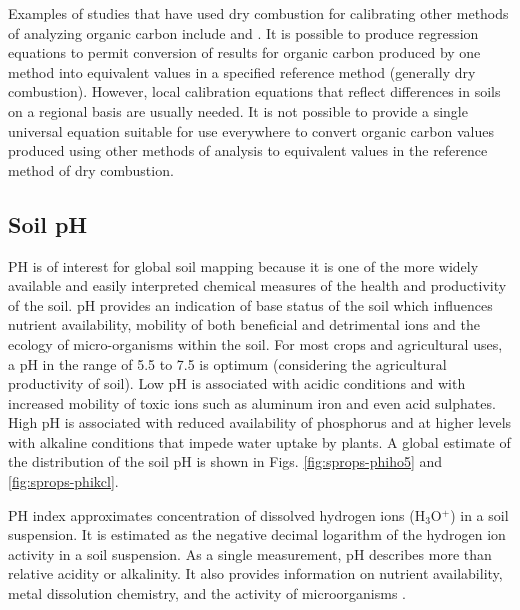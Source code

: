 \documentclass[11pt]{krantz}
\theoremstyle{definition}
\theoremstyle{definition}
\theoremstyle{definition}
\theoremstyle{remark}
\begin{document}
Examples of studies that have used dry combustion for calibrating other
methods of analyzing organic carbon include
\citeauthor{Kalembasa1973JSFA}
\citetext{\citeyear{Kalembasa1973JSFA}; \citealp{Grewal1991JSS}; \citealp{Soon1991CSSPA}; \citealp{Wang1996AJSR}; \citealp{Konen2002SSSAJ}; \citealp{Brye2003CSSPA}; \citealp{Mikhailova2003CSSPA}; \citealp{Bisutti2004TAC}; \citealp{Jankauskas2006CSSPA}; \citealp{DeVos2007SUM}}
and \citet{Meersmans2009SUM}. It is possible to produce regression
equations to permit conversion of results for organic carbon produced by
one method into equivalent values in a specified reference method
(generally dry combustion). However, local calibration equations that
reflect differences in soils on a regional basis are usually needed. It
is not possible to provide a single universal equation suitable for use
everywhere to convert organic carbon values produced using other methods
of analysis to equivalent values in the reference method of dry
combustion.

\hypertarget{soil-ph}{%
\subsection{Soil pH}\label{soil-ph}}

PH is of interest for global soil mapping because it is one of the more
widely available and easily interpreted chemical measures of the health
and productivity of the soil. pH provides an indication of base status
of the soil which influences nutrient availability, mobility of both
beneficial and detrimental ions and the ecology of micro-organisms
within the soil. For most crops and agricultural uses, a pH in the range
of 5.5 to 7.5 is optimum (considering the agricultural productivity of
soil). Low pH is associated with acidic conditions and with increased
mobility of toxic ions such as aluminum iron and even acid sulphates.
High pH is associated with reduced availability of phosphorus and at
higher levels with alkaline conditions that impede water uptake by
plants. A global estimate of the distribution of the soil pH is shown in
Figs. \ref{fig:sprops-phiho5} and \ref{fig:sprops-phikcl}.

PH index approximates concentration of dissolved hydrogen ions
(H\(_3\)O\(^+\)) in a soil suspension. It is estimated as the negative
decimal logarithm of the hydrogen ion activity in a soil suspension. As
a single measurement, pH describes more than relative acidity or
alkalinity. It also provides information on nutrient availability, metal
dissolution chemistry, and the activity of microorganisms
\citep{Miller2010SSSAJ}.
\end{document}
